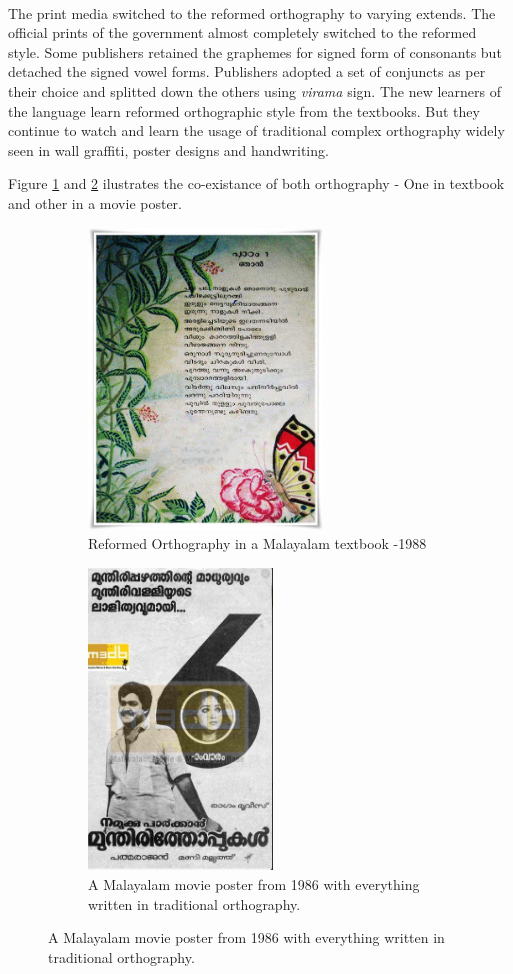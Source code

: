 \documentclass[10pt]{article}
\begin{document}
\paragraph{}
The print media switched to the reformed orthography to varying extends. The official prints of the government almost completely switched to the reformed style. Some publishers retained the graphemes for signed form of consonants but detached the signed vowel forms. Publishers adopted a set of conjuncts as per their choice and splitted down the others using \textit{virama} sign. The new learners of the language learn reformed orthographic style from the textbooks. But they continue to watch and learn the usage of traditional complex orthography widely seen in wall graffiti, poster designs and handwriting.

Figure \ref{1988Text} and \ref{1986Movie} ilustrates the co-existance of both orthography - One in textbook and other in a movie poster.

\begin{figure}[h!]
	\begin{subfigure}{.5\textwidth}
		\centering
		\includegraphics[width=\linewidth, height=8cm]{images/1988-reformed_text.jpg}
		\caption{Reformed Orthography in a Malayalam textbook -1988}
		\label{1988Text}
	\end{subfigure}
	\begin{subfigure}{.5\textwidth}
		\centering
		\includegraphics[width=\linewidth, height=8cm]{images/1986-Movieposter.png}
		\caption{A Malayalam movie poster from 1986 with everything written in traditional orthography.}
		\label{1986Movie}
	\end{subfigure}
	\label{1986and1988}
\end{figure}
\end{document}
